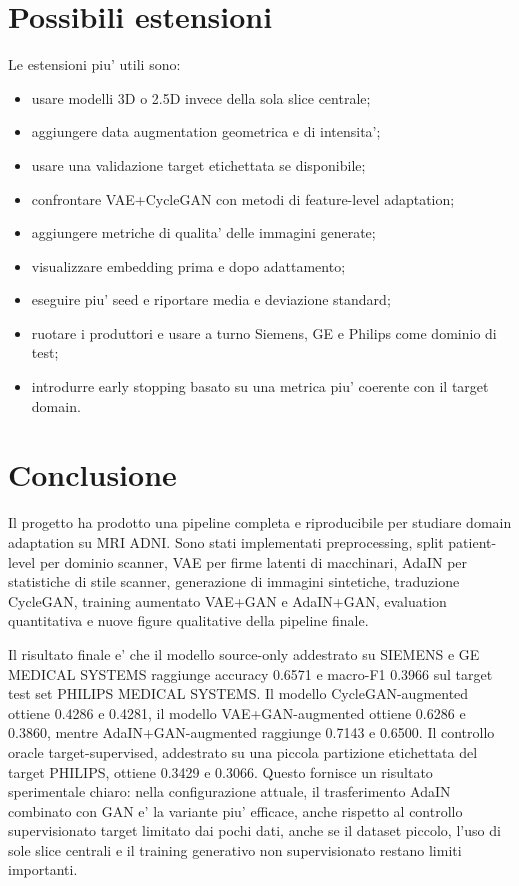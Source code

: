 \documentclass[12pt,a4paper]{article}
\begin{document}
\section{Possibili estensioni}

Le estensioni piu' utili sono:

\begin{itemize}[leftmargin=1.2cm]
    \item usare modelli 3D o 2.5D invece della sola slice centrale;
    \item aggiungere data augmentation geometrica e di intensita';
    \item usare una validazione target etichettata se disponibile;
    \item confrontare VAE+CycleGAN con metodi di feature-level adaptation;
    \item aggiungere metriche di qualita' delle immagini generate;
    \item visualizzare embedding prima e dopo adattamento;
    \item eseguire piu' seed e riportare media e deviazione standard;
    \item ruotare i produttori e usare a turno Siemens, GE e Philips come dominio di test;
    \item introdurre early stopping basato su una metrica piu' coerente con il target domain.
\end{itemize}

\section{Conclusione}

Il progetto ha prodotto una pipeline completa e riproducibile per studiare domain adaptation su MRI ADNI. Sono stati implementati preprocessing, split patient-level per dominio scanner, VAE per firme latenti di macchinari, AdaIN per statistiche di stile scanner, generazione di immagini sintetiche, traduzione CycleGAN, training aumentato VAE+GAN e AdaIN+GAN, evaluation quantitativa e nuove figure qualitative della pipeline finale.

Il risultato finale e' che il modello source-only addestrato su SIEMENS e GE MEDICAL SYSTEMS raggiunge accuracy 0.6571 e macro-F1 0.3966 sul target test set PHILIPS MEDICAL SYSTEMS. Il modello CycleGAN-augmented ottiene 0.4286 e 0.4281, il modello VAE+GAN-augmented ottiene 0.6286 e 0.3860, mentre AdaIN+GAN-augmented raggiunge 0.7143 e 0.6500. Il controllo oracle target-supervised, addestrato su una piccola partizione etichettata del target PHILIPS, ottiene 0.3429 e 0.3066. Questo fornisce un risultato sperimentale chiaro: nella configurazione attuale, il trasferimento AdaIN combinato con GAN e' la variante piu' efficace, anche rispetto al controllo supervisionato target limitato dai pochi dati, anche se il dataset piccolo, l'uso di sole slice centrali e il training generativo non supervisionato restano limiti importanti.
\end{document}
